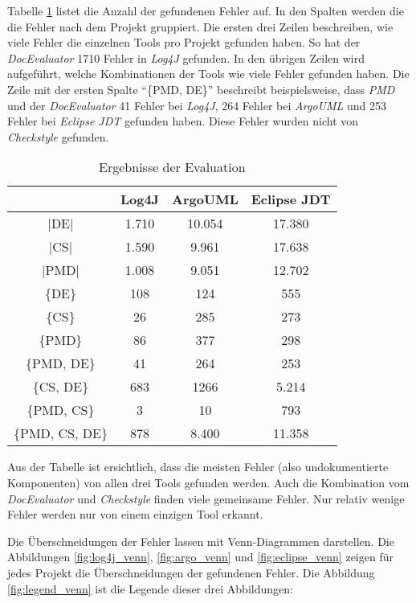 Tabelle \ref{tab:eval_results} listet die Anzahl der gefundenen Fehler auf. In den Spalten werden die die Fehler nach dem Projekt gruppiert. Die ersten drei Zeilen beschreiben, wie viele Fehler die einzelnen Tools pro Projekt gefunden haben. So hat  der \textit{DocEvaluator} 1710 Fehler in \textit{Log4J} gefunden.  In den übrigen Zeilen wird aufgeführt, welche Kombinationen der Tools wie viele Fehler gefunden haben. Die Zeile mit der ersten Spalte \enquote{\{PMD, DE\}} beschreibt beispielsweise, dass \textit{PMD} und der  \textit{DocEvaluator} 41 Fehler bei \textit{Log4J}, 264 Fehler bei \textit{ArgoUML} und 253 Fehler bei \textit{Eclipse \ac{JDT}} gefunden haben. Diese Fehler wurden nicht von \textit{Checkstyle} gefunden.  
\begin{table}[]
    \centering
\begin{tabular}{c|c|c|c}
          & Log4J & ArgoUML & Eclipse \ac{JDT} \\ \hline
|DE|            & 1.710 & 10.054  & 17.380      \\ \hline
|CS|            & 1.590 & 9.961   & 17.638      \\ \hline
|PMD|           & 1.008 & 9.051   & 12.702      \\ \hline\hline
\{DE\}          & 108   & 124     & 555         \\ \hline
\{CS\}          & 26    & 285     & 273         \\ \hline
\{PMD\}         & 86    & 377     & 298         \\ \hline
\{PMD, DE\}     & 41    & 264     & 253         \\ \hline
\{CS, DE\}      & 683   & 1266    & 5.214       \\ \hline
\{PMD, CS\}     & 3     & 10      & 793         \\ \hline
\{PMD, CS, DE\} & 878   & 8.400   & 11.358      \\ \hline
\end{tabular}
    \caption{Ergebnisse der Evaluation}
    \label{tab:eval_results}
\end{table}

Aus der Tabelle ist ersichtlich, dass die meisten Fehler (also undokumentierte Komponenten) von allen drei Tools gefunden werden. Auch die Kombination vom \textit{DocEvaluator} und \textit{Checkstyle} finden viele gemeinsame Fehler. Nur relativ wenige Fehler werden nur von einem einzigen Tool erkannt. 

Die Überschneidungen der Fehler lassen mit Venn-Diagrammen darstellen.  Die Abbildungen \ref{fig:log4j_venn}, \ref{fig:argo_venn} und  \ref{fig:eclipse_venn} zeigen für jedes Projekt die Überschneidungen der gefundenen Fehler. Die Abbildung \ref{fig:legend_venn} ist die Legende dieser drei Abbildungen:


